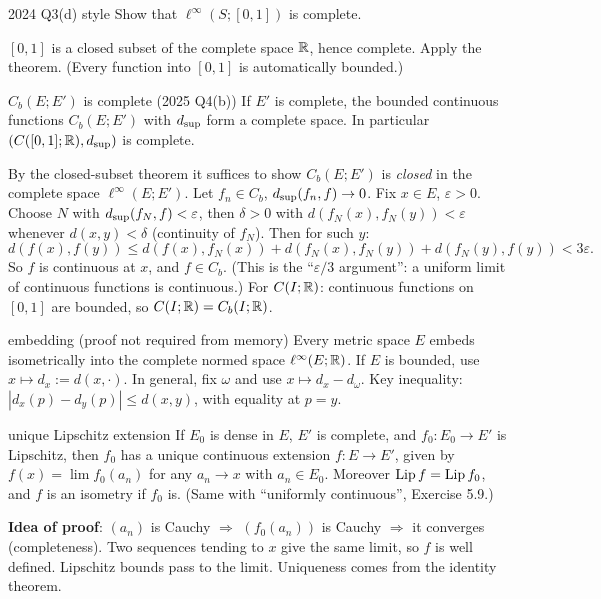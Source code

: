 \begin{exam}{2024 Q3(d) style}
Show that $\ell^\infty(S;[0,1])$ is complete.
\end{exam}
\begin{answer}
$[0,1]$ is a closed subset of the complete space $\mathbb R$, hence complete. Apply the theorem.
(Every function into $[0,1]$ is automatically bounded.)
\end{answer}

\begin{thm}{$C_b(E;E')$ is complete (2025 Q4(b))}
If $E'$ is complete, the bounded continuous functions $C_b(E;E')$ with $d_{\sup}$ form a complete
space. In particular $(C([0,1];\mathbb R),d_{\sup})$ is complete.
\end{thm}
\begin{answer}
By the closed-subset theorem it suffices to show $C_b(E;E')$ is \emph{closed} in the complete
space $\ell^\infty(E;E')$. Let $f_n\in C_b$, $d_{\sup}(f_n,f)\to0$. Fix $x\in E$, $\varepsilon>0$.
Choose $N$ with $d_{\sup}(f_N,f)<\varepsilon$, then $\delta>0$ with
$d(f_N(x),f_N(y))<\varepsilon$ whenever $d(x,y)<\delta$ (continuity of $f_N$). Then for such $y$:
\[d(f(x),f(y))\le d(f(x),f_N(x))+d(f_N(x),f_N(y))+d(f_N(y),f(y))<3\varepsilon.\]
So $f$ is continuous at $x$, and $f\in C_b$. (This is the ``$\varepsilon/3$ argument'': a uniform
limit of continuous functions is continuous.) For $C(I;\mathbb R)$: continuous functions on $[0,1]$ are
bounded, so $C(I;\mathbb R)=C_b(I;\mathbb R)$.
\end{answer}

\begin{thm}{embedding (proof not required from memory)}
Every metric space $E$ embeds isometrically into the complete normed space $\ell^\infty(E;\mathbb R)$.
If $E$ is bounded, use $x\mapsto d_x:=d(x,\cdot)$. In general, fix $\omega$ and use
$x\mapsto d_x-d_\omega$. Key inequality: $|d_x(p)-d_y(p)|\le d(x,y)$, with equality at $p=y$.
\end{thm}
\begin{thm}{unique Lipschitz extension}
If $E_0$ is dense in $E$, $E'$ is complete, and $f_0:E_0\to E'$ is Lipschitz, then $f_0$ has a
unique continuous extension $f:E\to E'$, given by $f(x)=\lim f_0(a_n)$ for any $a_n\to x$ with
$a_n\in E_0$. Moreover $\operatorname{Lip} f=\operatorname{Lip} f_0$, and $f$ is an isometry if $f_0$ is. (Same with
``uniformly continuous'', Exercise 5.9.)
\end{thm}
\textbf{Idea of proof}: $(a_n)$ is Cauchy $\Rightarrow$ $(f_0(a_n))$ is Cauchy $\Rightarrow$ it
converges (completeness). Two sequences tending to $x$ give the same limit, so $f$ is
well defined. Lipschitz bounds pass to the limit. Uniqueness comes from the identity theorem.

